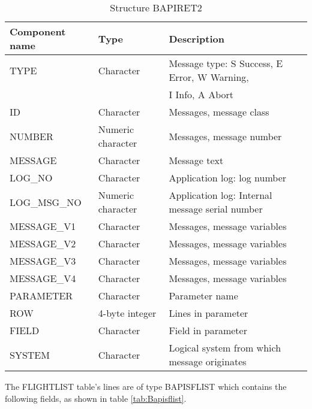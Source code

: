 \begin{table}[H]
  \centering
  \begin{tabular}{lll} \toprule 
    \textbf{Component name} & \textbf{Type}     & \textbf{Description} \\ \midrule
    TYPE                  & Character               & Message type: S Success, E Error, W Warning, \\ 
                             &                             & I Info, A Abort \\ 
    ID                      & Character                & Messages, message class \\  
    NUMBER              & Numeric character   & Messages, message number \\ 
    MESSAGE             & Character               & Message text \\ 
    LOG\_NO            & Character                & Application log: log number \\ 
    LOG\_MSG\_NO   & Numeric character    & Application log: Internal message serial number \\ 
    MESSAGE\_V1      & Character               & Messages, message variables \\ 
    MESSAGE\_V2      & Character               & Messages, message variables \\ 
    MESSAGE\_V3      & Character               & Messages, message variables \\ 
    MESSAGE\_V4      & Character               & Messages, message variables \\ 
    PARAMETER          & Character              & Parameter name \\ 
    ROW                    & 4-byte integer        & Lines in parameter \\ 
    FIELD                   & Character              & Field in parameter \\ 
    SYSTEM                & Character              & Logical system from which message originates \\ \bottomrule
  \end{tabular}
  \caption{Structure BAPIRET2}
  \label{tab:Bapiret2}
\end{table}

The FLIGHTLIST table's lines are of type BAPISFLIST which contains the following fields, as shown in table
\ref{tab:Bapisflist}.

